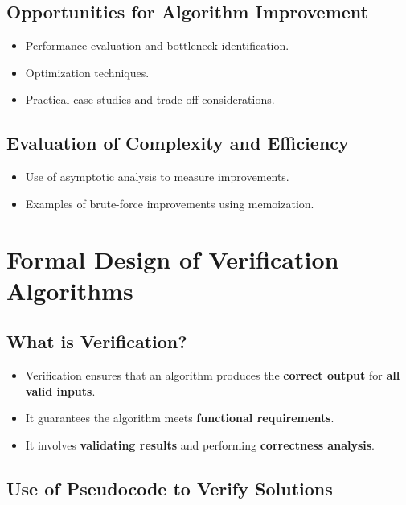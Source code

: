 \documentclass[12pt]{article}
\begin{document}
\subsection*{Opportunities for Algorithm Improvement}
\begin{itemize}
    \item Performance evaluation and bottleneck identification.
    \item Optimization techniques.
    \item Practical case studies and trade-off considerations.
\end{itemize}

\subsection*{Evaluation of Complexity and Efficiency}
\begin{itemize}
    \item Use of asymptotic analysis to measure improvements.
    \item Examples of brute-force improvements using memoization.
\end{itemize}




\section{Formal Design of Verification Algorithms}

\subsection*{What is Verification?}
\begin{itemize}
    \item Verification ensures that an algorithm produces the \textbf{correct output} for \textbf{all valid inputs}.
    \item It guarantees the algorithm meets \textbf{functional requirements}.
    \item It involves \textbf{validating results} and performing \textbf{correctness analysis}.
\end{itemize}

\subsection{Use of Pseudocode to Verify Solutions}
\end{document}
